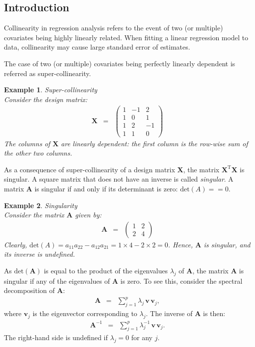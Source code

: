 \documentclass[a4paper]{article}
\theoremstyle{myexamplestyle}
\newtheorem{example}{Example}
\begin{document}
\subsection{Introduction}
Collinearity in regression analysis refers to the event of two (or multiple) covariates being highly linearly related. When fitting a linear regression model to data, collinearity may cause large standard error of estimates. 

The case of two (or multiple) covariates being perfectly linearly dependent is referred as super-collinearity. 

\begin{example} \textit{Super-collinearity}
\\
Consider the design matrix:
\begin{eqnarray*}
\mathbf{X} & = & \left(
\begin{array}{rrr}
1 & -1 & 2
\\
1 & 0 & 1
\\
1 & 2  & -1
\\
1 & 1  & 0
\end{array} \right)
\end{eqnarray*}
The columns of $\mathbf{X}$ are linearly dependent: the first column is the row-wise sum of the other two columns. 
\end{example}

As a consequence of super-collinearity of a design matrix $\mathbf{X}$, the matrix 
$\mathbf{X}^{\mathrm{T}} \mathbf{X}$ is singular. A square matrix that does not have an inverse is called \textit{singular}. A matrix $\mathbf{A}$ is singular if and only if its determinant is zero: $\mbox{det}(A)= = 0$.

\begin{example} \textit{Singularity} \label{example.singular}
\\
Consider the matrix $\mathbf{A}$ given by:
\begin{eqnarray*}
\mathbf{A} & = & \left(
\begin{array}{rr}
1 & 2
\\
2 & 4
\end{array} \right)
\end{eqnarray*}
Clearly, $\mbox{det}(A) = a_{11} a_{22} - a_{12} a_{21} = 1 \times 4 - 2 \times 2 = 0$. 
Hence, $\mathbf{A}$ is singular, and its inverse is undefined.
\end{example}

As $\mbox{det}(\mathbf{A})$ is equal to the product of the eigenvalues $\lambda_j$ of $\mathbf{A}$, the matrix $\mathbf{A}$ is singular if any of the eigenvalues of $\mathbf{A}$ is zero. To see this, consider the spectral decomposition of $\mathbf{A}$:
\begin{eqnarray*}
\mathbf{A} & = & \sum_{j=1}^p \lambda_j \, \mathbf{v} \, \mathbf{v}_j,
\end{eqnarray*}
where $\mathbf{v}_j$ is the eigenvector corresponding to $\lambda_j$. The inverse of $\mathbf{A}$ is then:
\begin{eqnarray*}
\mathbf{A}^{-1} & = & \sum_{j=1}^p \lambda_j^{-1} \, \mathbf{v} \, \mathbf{v}_j.
\end{eqnarray*}
The right-hand side is undefined if $\lambda_j =0$ for any $j$.
\end{document}
